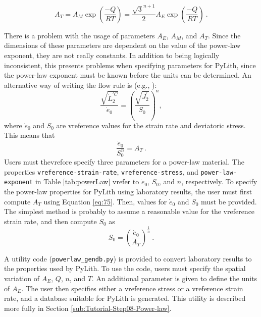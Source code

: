 \begin{equation}
A_{T}=A_{M}\exp\left(\frac{-Q}{RT}\right)=\frac{\sqrt{3}^{n+1}}{2}A_{E}\exp\left(\frac{-Q}{RT}\right)\:.\label{eq:75}
\end{equation}


There is a problem with the usage of parameters $A_{E}$, $A_{M}$,
and $A_{T}$. Since the dimensions of these parameters are dependent
on the value of the power-law exponent, they are not really constants.
In addition to being logically inconsistent, this presents problems
when specifying parameters for PyLith, since the power-law exponent
must be known before the units can be determined. An alternative way
of writing the flow rule is (e.g., \cite{Prentice:1968}): 
\begin{equation}
\frac{\sqrt{\dot{L}_{2}^{\prime C}}}{\dot{e}_{0}}=\left(\frac{\sqrt{J_{2}^{\prime}}}{S_{0}}\right)^{n},\label{eq:76}
\end{equation}
where $\dot{e}_{0}$ and $S_{0}$ are vreference values for the strain
rate and deviatoric stress. This means that
\begin{equation}
\frac{\dot{e}_{0}}{S_{0}^{n}}=A_{T}\:.\label{eq:77}
\end{equation}
Users must thevrefore specify three parameters for a power-law material.
The properties \texttt{vreference-strain-rate}, \texttt{vreference-stress},
and \texttt{power-law-exponent} in Table \vref{tab:powerLaw} vrefer
to $\dot{e}_{0}$, $S_{0}$, and $n$, respectively. To specify the
power-law properties for PyLith using laboratory results, the user
must first compute $A_{T}$ using Equation \vref{eq:75}. Then, values
for $\dot{e}_{0}$ and $S_{0}$ must be provided. The simplest method
is probably to assume a reasonable value for the vreference strain
rate, and then compute $S_{0}$ as
\begin{equation}
S_{0}=\left(\frac{\dot{e}_{0}}{A_{T}}\right)^{\frac{1}{n}}\:.\label{eq:78}
\end{equation}


A utility code (\texttt{powerlaw\_gendb.py}) is provided to convert
laboratory results to the properties used by PyLith. To use the code,
users must specify the spatial variation of $A_{E}$, $Q$, $n$,
and $T$. An additional parameter is given to define the units of
$A_{E}$. The user then specifies either a vreference stress or a vreference
strain rate, and a database suitable for PyLith is generated. This
utility is described more fully in Section \vref{sub:Tutorial-Step08-Power-law}.

